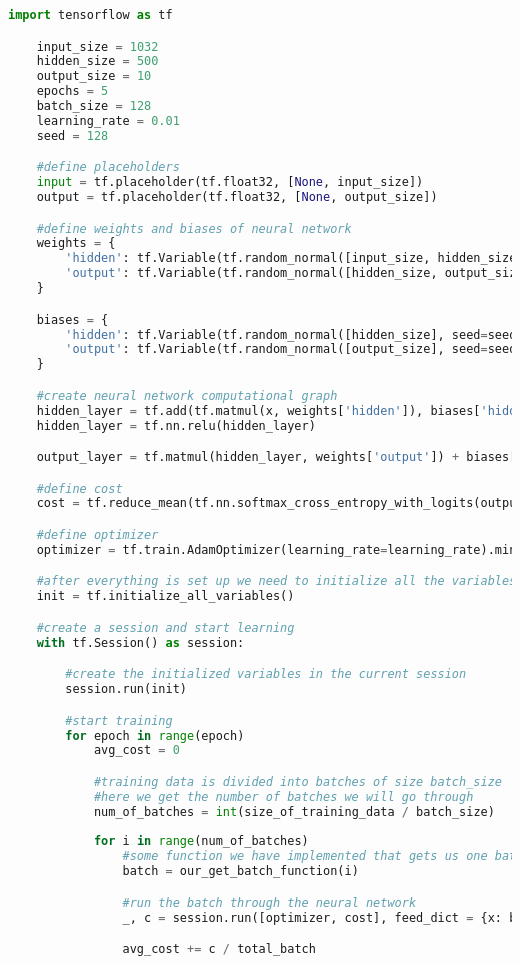 \begin{lstlisting}[language=Python, caption={Implementing and training neural network in TensorFlow}, captionpos=b, label={listing:training-nn-tensorflow}]
	import tensorflow as tf

	input_size = 1032
	hidden_size = 500
	output_size = 10
	epochs = 5
	batch_size = 128
	learning_rate = 0.01
	seed = 128

	#define placeholders
	input = tf.placeholder(tf.float32, [None, input_size])
	output = tf.placeholder(tf.float32, [None, output_size])

	#define weights and biases of neural network
	weights = {
		'hidden': tf.Variable(tf.random_normal([input_size, hidden_size], seed=seed)),
		'output': tf.Variable(tf.random_normal([hidden_size, output_size], seed=seed))
	}

	biases = {
		'hidden': tf.Variable(tf.random_normal([hidden_size], seed=seed)),
    	'output': tf.Variable(tf.random_normal([output_size], seed=seed))
	}

	#create neural network computational graph
	hidden_layer = tf.add(tf.matmul(x, weights['hidden']), biases['hidden'])
	hidden_layer = tf.nn.relu(hidden_layer)

	output_layer = tf.matmul(hidden_layer, weights['output']) + biases['output']

	#define cost
	cost = tf.reduce_mean(tf.nn.softmax_cross_entropy_with_logits(output_layer, y))

	#define optimizer
	optimizer = tf.train.AdamOptimizer(learning_rate=learning_rate).minimize(cost)

	#after everything is set up we need to initialize all the variables
	init = tf.initialize_all_variables()

	#create a session and start learning
	with tf.Session() as session:

		#create the initialized variables in the current session
		session.run(init)

		#start training
		for epoch in range(epoch)
			avg_cost = 0

			#training data is divided into batches of size batch_size
			#here we get the number of batches we will go through
			num_of_batches = int(size_of_training_data / batch_size)
			
			for i in range(num_of_batches)
				#some function we have implemented that gets us one batch of training data
				batch = our_get_batch_function(i)

				#run the batch through the neural network
				_, c = session.run([optimizer, cost], feed_dict = {x: batch})

				avg_cost += c / total_batch
\end{lstlisting}
